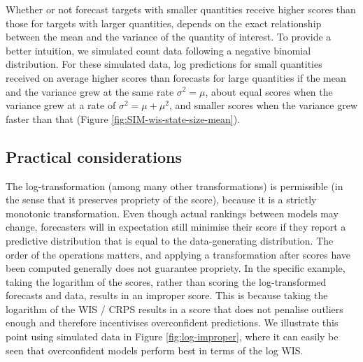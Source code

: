 \documentclass{article}
\begin{document}
Whether or not forecast targets with smaller quantities receive higher scores than those for targets with larger quantities, depends on the exact relationship between the mean and the variance of the quantity of interest. To provide a better intuition, we simulated count data following a negative binomial distribution. For these simulated data, log predictions for small quantities received on average higher scores than forecasts for large quantities if the mean and the variance grew at the same rate $\sigma^2 = \mu$, about equal scores when the variance grew at a rate of $\sigma^2 = \mu + \mu^2$, and smaller scores when the variance grew faster than that (Figure \ref{fig:SIM-wis-state-size-mean}). 

\subsection{Practical considerations}
\label{sec:methods:considerations}

The log-transformation (among many other transformations) is permissible (in the sense that it preserves propriety of the score), because it is a strictly monotonic transformation. Even though actual rankings between models may change, forecasters will in expectation still minimise their score if they report a predictive distribution that is equal to the data-generating distribution. The order of the operations matters, and applying a transformation after scores have been computed generally does not guarantee propriety. In the specific example, taking the logarithm of the scores, rather than scoring the log-transformed forecasts and data, results in an improper score. This is because taking the logarithm of the WIS / CRPS results in a score that does not penalise outliers enough and therefore incentivises overconfident predictions. We illustrate this point using simulated data in Figure \ref{fig:log-improper}, where it can easily be seen that overconfident models perform best in terms of the log WIS. 
\end{document}
